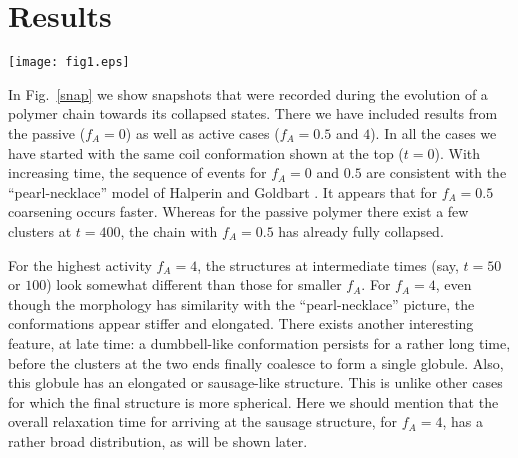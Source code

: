 \documentclass[aps,prx,reprint,showpacs,showkeys,noeprint,longbibliography]{revtex4-1} %
\begin{document}
\section{ Results}\label{result}
\begin{figure*}[t!]
	\centering
	\texttt{[image: fig1.eps]}
	\caption{\label{snap} Snapshots obtained at different times during the evolution, are shown for  
		the collapse of a polymer with $N=512$.  We have included results for 
the passive ($f_A=0$) as well as the active cases ($f_A=0.5$ and $4$). 
		The times are mentioned below each of the conformations.}
\end{figure*}
In Fig.~\ref{snap} we show snapshots that were recorded during the evolution of a polymer chain towards its collapsed states. There we have included results from the passive ($f_A=0$) as well as active cases ($f_A=0.5$ and $4$). In all the
cases we have started with the same coil conformation shown at the top ($t=0$). With increasing time, the sequence of events for $f_A=0$ and $0.5$ are consistent with the ``pearl-necklace'' model of Halperin and Goldbart \cite{halperin}. It appears that for $f_A=0.5$ coarsening occurs faster. Whereas for the passive polymer there exist a few 
clusters at $t=400$, the chain with $f_A=0.5$ has already fully collapsed.
\par 
For the highest activity $f_A=4$, the structures at intermediate times (say, $t=50$ or $100$) look somewhat different than those for smaller $f_A$. For $f_A=4$, even though the morphology has similarity with the ``pearl-necklace'' picture, the conformations appear stiffer and elongated. There exists another interesting feature, at late time: a dumbbell-like conformation persists for a rather long time, before the clusters at the two ends finally coalesce to form a single globule. Also, this globule has an elongated or sausage-like structure. This is unlike other cases for which the final structure is more spherical. Here we should mention that the overall relaxation time for arriving at the sausage structure, for $f_A=4$, has a rather broad distribution, as will be shown later.
\end{document}
